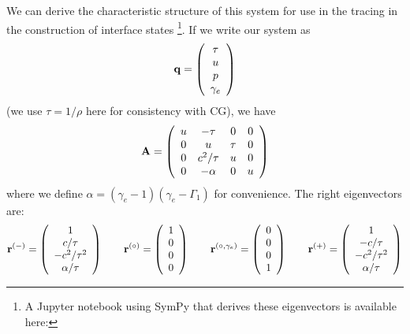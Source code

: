 We can derive the characteristic structure of this system for use
in the tracing in the construction of interface states%
\footnote{A {\sf Jupyter} notebook using {\sf SymPy} that derives these
eigenvectors is available here:
}.
If we write 
our system as
\begin{equation}
{\bf q} = \left ( \begin{array}{c} \tau \\ u \\ p \\ \gamma_e \end{array} \right )
\end{equation}
(we use $\tau = 1/\rho$ here for consistency with CG), we have
\begin{equation}
{\bf A} = \left ( \begin{array}{cccc} u & -\tau    & 0      & 0 \\
                                0 & u        & \tau   & 0 \\
                                0 & c^2/\tau & u      & 0 \\
                                0 & -\alpha  & 0      & u
            \end{array} \right )
\end{equation}
where we define $\alpha = (\gamma_e - 1)(\gamma_e - \Gamma_1)$ for
convenience.  The right eigenvectors are:
\begin{equation}
\rb^\evm = \left( \begin{array}{c} 1\\ {c}/{\tau}\\ -{c^{2}}/{\tau^{2}}\\ {\alpha}/{\tau}\end{array}\right)
%
\qquad
\rb^\evz = \left( \begin{array}{c} 1\\0\\0\\0 \end{array}\right)
%
\qquad
\rb^\evzs{\gamma_e} = \left( \begin{array}{c} 0\\0\\0\\1\end{array}\right)
%
\qquad
\rb^\evp = \left( \begin{array}{c} 1\\ -{c}/{\tau}\\ -{c^{2}}/{\tau^{2}}\\ {\alpha}/{\tau} \end{array}\right )
\end{equation}
